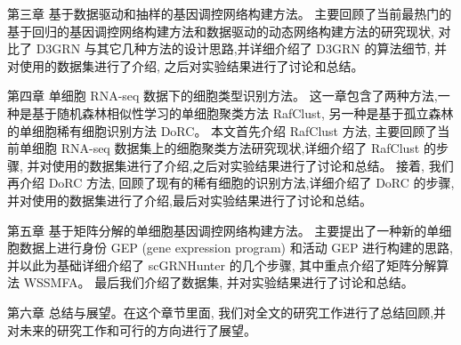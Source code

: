 第三章 基于数据驱动和抽样的基因调控网络构建方法。
主要回顾了当前最热门的基于回归的基因调控网络构建方法和数据驱动的动态网络构建方法的研究现状,
对比了 D3GRN 与其它几种方法的设计思路,并详细介绍了 D3GRN 的算法细节,
并对使用的数据集进行了介绍, 之后对实验结果进行了讨论和总结。



第四章 单细胞 RNA-seq 数据下的细胞类型识别方法。
这一章包含了两种方法,一种是基于随机森林相似性学习的单细胞聚类方法 RafClust,
另一种是基于孤立森林的单细胞稀有细胞识别方法 DoRC。
本文首先介绍 RafClust 方法, 主要回顾了当前单细胞 RNA-seq 数据集上的细胞聚类方法研究现状,详细介绍了 RafClust 的步骤,
并对使用的数据集进行了介绍,之后对实验结果进行了讨论和总结。
接着, 我们再介绍 DoRC 方法, 回顾了现有的稀有细胞的识别方法,详细介绍了 DoRC 的步骤,
并对使用的数据集进行了介绍,最后对实验结果进行了讨论和总结。

第五章 基于矩阵分解的单细胞基因调控网络构建方法。
主要提出了一种新的单细胞数据上进行身份 GEP (gene expression program) 和活动 
GEP 进行构建的思路, 并以此为基础详细介绍了 scGRNHunter 的几个步骤, 其中重点介绍了矩阵分解算法 WSSMFA。
最后我们介绍了数据集, 并对实验结果进行了讨论和总结。


第六章 总结与展望。在这个章节里面, 我们对全文的研究工作进行了总结回顾,并对未来的研究工作和可行的方向进行了展望。